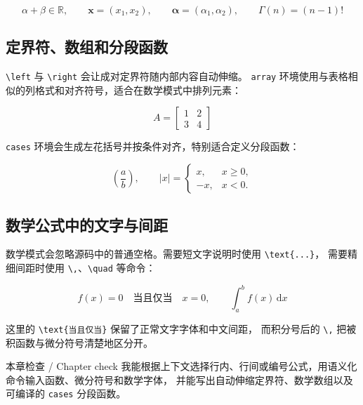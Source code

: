 \[
    \alpha+\beta\in\mathbb{R},\qquad
    \mathbf{x}=(x_1,x_2),\qquad
    \bm{\alpha}=(\alpha_1,\alpha_2),\qquad
    \Gamma(n)=(n-1)!
\]

\subsection{定界符、数组和分段函数}

\verb|\left| 与 \verb|\right| 会让成对定界符随内部内容自动伸缩。
\texttt{array} 环境使用与表格相似的列格式和对齐符号，适合在数学模式中排列元素：

\[
    A=\left[
    \begin{array}{cc}
        1 & 2 \\
        3 & 4
    \end{array}
    \right]
\]

\texttt{cases} 环境会生成左花括号并按条件对齐，特别适合定义分段函数：

\[
    \left(
    \frac{a}{b}
    \right),
    \qquad
    |x|=
    \begin{cases}
        x, & x\ge 0,\\
        -x, & x<0.
    \end{cases}
\]

\subsection{数学公式中的文字与间距}

数学模式会忽略源码中的普通空格。需要短文字说明时使用 \verb|\text{...}|，
需要精细间距时使用 \verb|\,|、\verb|\quad| 等命令：

\[
    f(x)=0\quad\text{当且仅当}\quad x=0,
    \qquad
    \int_a^b f(x)\,\mathrm{d}x
\]

这里的 \verb|\text{当且仅当}| 保留了正常文字字体和中文间距，
而积分号后的 \verb|\,| 把被积函数与微分符号清楚地区分开。

\begin{learningbox}{本章检查 / Chapter check}
我能根据上下文选择行内、行间或编号公式，用语义化命令输入函数、微分符号和数学字体，
并能写出自动伸缩定界符、数学数组以及可编译的 \texttt{cases} 分段函数。
\end{learningbox}
